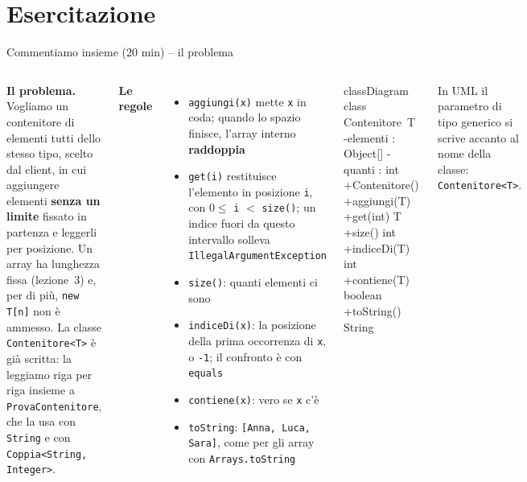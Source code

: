 \documentclass[10pt,aspectratio=169,xcolor={table}]{beamer}
\begin{document}
\section{Esercitazione}

\begin{frame}[fragile]{Commentiamo insieme (20 min) -- il problema}
\begin{columns}[T]
\footnotesize
\textbf{Il problema.} Vogliamo un contenitore di elementi tutti dello stesso tipo, scelto dal client, in cui aggiungere elementi \textbf{senza un limite} fissato in partenza e leggerli per posizione. Un array ha lunghezza fissa (lezione~3) e, per di più, \texttt{new T[n]} non è ammesso. La classe \texttt{Contenitore<T>} è già scritta: la leggiamo riga per riga insieme a \texttt{ProvaContenitore}, che la usa con \texttt{String} e con \texttt{Coppia<String, Integer>}.

\vspace{0.1cm}
\textbf{Le regole}
\begin{itemize}\itemsep=2pt
    \item \texttt{aggiungi(x)} mette \texttt{x} in coda; quando lo spazio finisce, l'array interno \textbf{raddoppia}
    \item \texttt{get(i)} restituisce l'elemento in posizione \texttt{i}, con $0 \leq$ \texttt{i} $<$ \texttt{size()}; un indice fuori da questo intervallo solleva \texttt{IllegalArgumentException}
    \item \texttt{size()}: quanti elementi ci sono
    \item \texttt{indiceDi(x)}: la posizione della prima occorrenza di \texttt{x}, o \texttt{-1}; il confronto è con \texttt{equals}
    \item \texttt{contiene(x)}: vero se \texttt{x} c'è
    \item \texttt{toString}: \texttt{[Anna, Luca, Sara]}, come per gli array con \texttt{Arrays.toString}
\end{itemize}

\begin{mermaid}
classDiagram
  class Contenitore~T~ {
    -elementi : Object[]
    -quanti : int
    +Contenitore()
    +aggiungi(T)
    +get(int) T
    +size() int
    +indiceDi(T) int
    +contiene(T) boolean
    +toString() String
  }
\end{mermaid}
\footnotesize
In UML il parametro di tipo generico si scrive accanto al nome della classe: \texttt{Contenitore<T>}.
\end{columns}
\end{frame}
\end{document}
